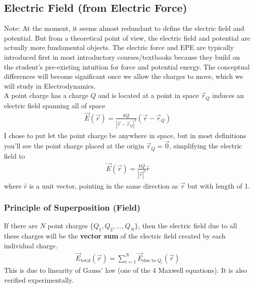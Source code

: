\documentclass{article}
\begin{document}
\subsection{Electric Field (from Electric Force)}
Note: At the moment, it seems almost redundant to define the electric field and potential. But from a theoretical point of view, the electric field and potential are actually more fundamental objects. The electric force and EPE are typically introduced first in most introductory courses/textbooks because they build on the student's pre-existing intuition for force and potential energy. The conceptual differences will become significant once we allow the charges to move, which we will study in Electrodynamics. \\[10pt]
A point charge has a charge $Q$ and is located at a point in space $\vec{r}_Q$ induces an electric field spanning all of space
\begin{align}
    \vec{E}(\vec{r}) = \frac{kQ}{|\vec{r} - \vec{r}_Q|^3} (\vec{r} - \vec{r}_Q)
\end{align}
I chose to put let the point charge be anywhere in space, but in most definitions you'll see the point charge placed at the origin $\vec{r}_Q = \vec{0}$, simplifying the electric field to
\begin{align}
    \vec{E}(\vec{r}) = \frac{kQ}{|\vec{r}|^2} \hat{r}
\end{align}
where $\hat r$ is a unit vector, pointing in the same direction as $\vec{r}$ but with length of 1. 
\subsubsection{Principle of Superposition (Field)}
If there are $N$ point charges $\{Q_1, Q_2, ..., Q_N\}$, then the electric field due to all these charges will be the \textbf{vector sum} of the electric field created by each individual charge. 
\begin{align}
    \vec{E}_{\text{total}}(\vec{r}) = \sum_{i=1}^N \vec{E}_{\text{due to }Q_i}(\vec{r})
\end{align}
This is due to linearity of Gauss' law (one of the 4 Maxwell equations). It is also verified experimentally.
\end{document}
